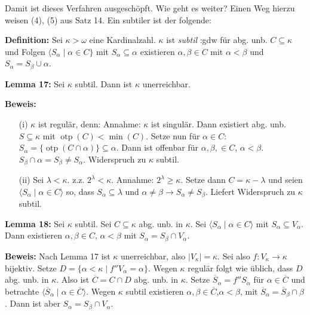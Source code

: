 \documentclass[a4paper,fontsize=11pt]{scrartcl}
\newcommand{\otp}{\operatorname{otp}}
\renewcommand{\bar}[1]{\overline{#1}}
\begin{document}
Damit ist dieses Verfahren ausgeschöpft.
Wie geht es weiter?
Einen Weg hierzu weisen (4), (5) aus Satz 14.
Ein subtiler ist der folgende:

{\bf Definition:} Sei $\kappa>\omega$ eine Kardinalzahl.
  $\kappa$ ist \emph{subtil} :gdw 
  für abg. unb. $C\subseteq \kappa$ und Folgen $\langle S_{\alpha}\mid \alpha\in C\}$
  mit $S_{\alpha}\subseteq \alpha$ existieren $\alpha,\beta\in C$ mit $\alpha<\beta$ und $S_{\alpha}=S_{\beta}\cup\alpha$.

{\bf Lemma 17:} Sei $\kappa$ subtil. Dann ist $\kappa$ unerreichbar.
  
  {\bf Beweis:} \begin{enumerate}
    \item[(i)] $\kappa$ ist regulär, denn: Annahme: $\kappa$ ist singulär.
      Dann existiert abg. unb. $S\subseteq \kappa$ mit $\otp(C)<\min(C)$.
      Setze nun für $\alpha\in C$:
      $S_{\alpha} = \{\otp(C\cap \alpha)\}\subseteq \alpha$.
      Dann ist offenbar für $\alpha,\beta,\in C$, $\alpha<\beta$.
      $S_{\beta}\cap\alpha= S_{\beta}\neq S_{\alpha}$. 
      Widerspruch zu $\kappa$ subtil.
    \item[(ii)] Sei $\lambda<\kappa$. z.z. $2^\lambda<\kappa$.
      Annahme: $2^\lambda\ge\kappa$. 
      Setze dann $C=\kappa-\lambda$ und seien $\langle S_{\alpha}\mid\alpha\in C\rangle$ so, 
      dass $S_{\alpha}\subseteq \lambda$ und $\alpha\neq\beta\to S_{\alpha}\neq S_{\beta}$.
      Liefert Widerspruch zu $\kappa$ subtil.
  \end{enumerate}
  
{\bf Lemma 18:} Sei $\kappa$ subtil. 
  Sei $C\subseteq\kappa$ abg. unb. in $\kappa$.
  Sei $\langle S_{\alpha}\mid \alpha\in C\rangle$ mit $S_{\alpha}\subseteq V_{\alpha}$.
  Dann existieren $\alpha,\beta\in C$, $\alpha <\beta$ mit $S_{\alpha}=S_{\beta}\cap V_{\alpha}$.
  
  {\bf Beweis:} Nach Lemma 17 ist $\kappa$ unerreichbar, also $|V_{\kappa}|=\kappa$.
    Sei also $f\colon V_{\kappa}\to\kappa$ bijektiv.
    Setze $D=\{\alpha<\kappa\mid f''V_{\alpha}=\alpha\}$.
    Wegen $\kappa$ regulär folgt wie üblich, dass $D$ abg. unb. in $\kappa$.
    Also ist $\overline C=C\cap D$ abg. unb. in $\kappa$.
    Setze $\overline S_{\alpha}=f''S_{\alpha}$ für $\alpha\in \overline C$ und betrachte $\langle \overline S_{\alpha}\mid \alpha\in \bar C \rangle$.
    Wegen $\kappa$ subtil existieren $\alpha,\beta\in\bar C$,$\alpha<\beta$, mit $\bar S_{\alpha}=\bar S_{\beta}\cap\beta$.
    Dann ist aber $S_{\alpha}=S_{\beta}\cap V_{\alpha}$.
\end{document}
